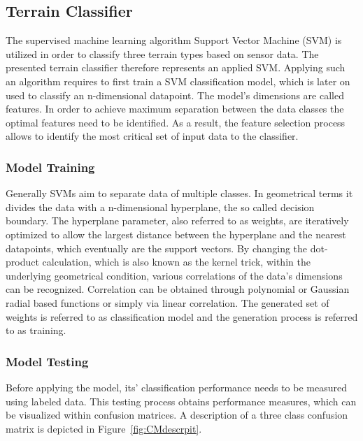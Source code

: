 \documentclass{article}
\begin{document}
\subsection{Terrain Classifier}

The supervised machine learning algorithm Support Vector Machine (SVM) is utilized in order to classify three terrain types based on sensor data. The presented terrain classifier therefore represents an applied SVM. Applying such an algorithm requires to first train a SVM classification model, which is later on used to classify an n-dimensional datapoint.
The model's dimensions are called features. In order to achieve maximum separation between the data classes the optimal features need to be identified. As a result, the feature selection process allows to identify the most critical set of input data to the classifier. 

\subsubsection{Model Training}
Generally SVMs aim to separate data of multiple classes. In geometrical terms it divides the data with a n-dimensional hyperplane, the so called decision boundary. The hyperplane parameter, also referred to as weights, are iteratively optimized to allow the largest distance between the hyperplane and the nearest datapoints, which eventually are the support vectors.  
By changing the dot-product calculation, which is also known as the kernel trick, within the underlying geometrical condition, various correlations of the data's dimensions can be recognized. Correlation can be obtained through polynomial or Gaussian radial based functions or simply via linear correlation.
The generated set of weights is referred to as classification model and the generation process is referred to as training.\cite{kuhr2021}

\subsubsection{Model Testing}
Before applying the model, its' classification performance needs to be measured using labeled data. This testing process obtains performance measures, which can be visualized within confusion matrices. A description of a three class confusion matrix is depicted in Figure~\ref{fig:CMdescrpit}.\cite{kuhr2021}
\end{document}
